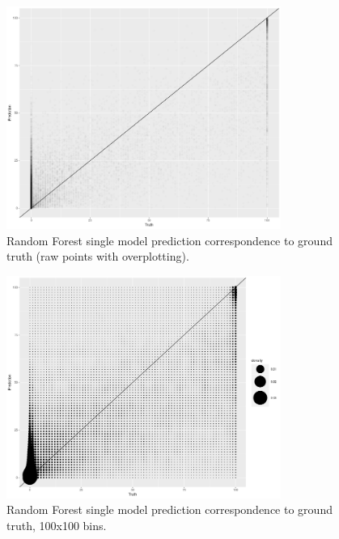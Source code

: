 \documentclass[a4paper,10pt]{article}
\begin{document}
\begin{figure}
    \includegraphics[width=0.8\textwidth]{article-figures/binplots/2019-04-12-rf-1m-uncor-points-a001s2}
    \caption{Random Forest single model prediction correspondence to ground truth (raw points with overplotting).}
    \label{raw-rf-1m-uncor}
\end{figure}
\begin{figure}
    \includegraphics[width=0.8\textwidth]{article-figures/binplots/2019-04-12-rf-1m-uncor-point-n100s20}
    \caption{Random Forest single model prediction correspondence to ground truth, 100x100 bins.}
    \label{bin-rf-1m-uncor-n100}
\end{figure}
\end{document}
